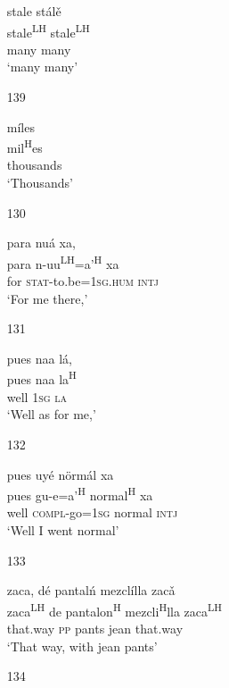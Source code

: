 \begin{itemize}
\glll   stale st\'{a}l\v{e}\\
stale\textsuperscript{LH} stale\textsuperscript{LH}\\
 many many\\
\glt `many many'
 



\item[139]
 
\glll   m\'{i}les\\
mil\textsuperscript{H}es\\
thousands\\
\glt `Thousands'
 

\item[130]
 
\glll   para nu\'{a} xa, \\
para n-uu\textsuperscript{LH}=a'\textsuperscript{H} xa \\
for \textsc{stat}-to.be=\textsc{1sg.hum} \textsc{intj}\\
\glt `For me there,'
 


\item[131]
 
\glll   pues naa l\'{a}, \\
pues naa la\textsuperscript{H}\\
well \textsc{1sg} \textsc{la}\\
\glt `Well as for me,'
 


\item[132]
 
\glll   pues uy\'{e} n\"{o}rm\'{a}l xa\\
pues gu-e=a'\textsuperscript{H} normal\textsuperscript{H} xa \\
well \textsc{compl}-go=\textsc{1sg} normal \textsc{intj}\\
\glt `Well I went normal'
 


\item[133]
 
\glll   zaca, d\'{e} pantal\'{n} mezcl\'{i}lla zac\v{a}\\
zaca\textsuperscript{LH} de pantalon\textsuperscript{H} mezcli\textsuperscript{H}lla zaca\textsuperscript{LH}\\
that.way \textsc{pp} pants jean that.way\\
\glt `That way, with jean pants'
 


\item[134]
 

\end{itemize}
